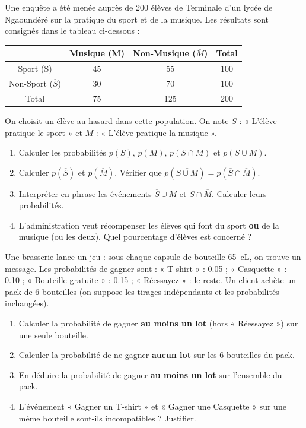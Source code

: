 \documentclass[11pt]{article}
\begin{document}
\begin{exercice}
Une enquête a été menée auprès de \num{200} élèves de Terminale d'un lycée de Ngaoundéré sur la pratique du sport et de la musique. Les résultats sont consignés dans le tableau ci-dessous :
\begin{center}
\begin{tabular}{|c|c|c|c|}
\hline
 & Musique (M) & Non-Musique ($\overline{M}$) & Total \\
\hline
Sport (S) & 45 & 55 & 100 \\
\hline
Non-Sport ($\overline{S}$) & 30 & 70 & 100 \\
\hline
Total & 75 & 125 & 200 \\
\hline
\end{tabular}
\end{center}
On choisit un élève au hasard dans cette population. On note $S$ : « L'élève pratique le sport » et $M$ : « L'élève pratique la musique ».
\begin{enumerate}
    \item Calculer les probabilités $p(S)$, $p(M)$, $p(S \cap M)$ et $p(S \cup M)$.
    \item Calculer $p(\overline{S})$ et $p(\overline{M})$. Vérifier que $p(\overline{S \cup M}) = p(\overline{S} \cap \overline{M})$.
    \item Interpréter en phrase les événements $\overline{S} \cup M$ et $S \cap \overline{M}$. Calculer leurs probabilités.
    \item L'administration veut récompenser les élèves qui font du sport \textbf{ou} de la musique (ou les deux). Quel pourcentage d'élèves est concerné ?
\end{enumerate}
\end{exercice}

\begin{exercice}
Une brasserie lance un jeu : sous chaque capsule de bouteille \SI{65}{cL}, on trouve un message. Les probabilités de gagner sont : « T-shirt » : \num{0,05} ; « Casquette » : \num{0,10} ; « Bouteille gratuite » : \num{0,15} ; « Réessayez » : le reste. Un client achète un pack de \num{6} bouteilles (on suppose les tirages indépendants et les probabilités inchangées).
\begin{enumerate}
    \item Calculer la probabilité de gagner \textbf{au moins un lot} (hors « Réessayez ») sur une seule bouteille.
    \item Calculer la probabilité de ne gagner \textbf{aucun lot} sur les \num{6} bouteilles du pack.
    \item En déduire la probabilité de gagner \textbf{au moins un lot} sur l'ensemble du pack.
    \item L'événement « Gagner un T-shirt » et « Gagner une Casquette » sur une même bouteille sont-ils incompatibles ? Justifier.
\end{enumerate}
\end{exercice}
\end{document}
